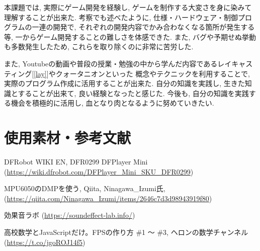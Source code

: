 \documentclass[10pt]{jsarticle}
\begin{document}
本課題では, 実際にゲーム開発を経験し, ゲームを制作する大変さを身に染みて理解することが出来た.
考察でも述べたように, 仕様・ハードウェア・制御プログラムの一連の開発で, 
それぞれの開発内容でかみ合わなくなる箇所が発生する等, 一からゲーム開発することの難しさを体感できた.
また, バグや予期せぬ挙動も多数発生したため, これらを取り除くのに非常に苦労した.

また, Youtubeの動画や普段の授業・勉強の中から学んだ内容であるレイキャスティング[\ref{lay}]やクォータニオンといった
概念やテクニックを利用することで, 実際のプログラム作成に活用することが出来た.
自分の知識を実践し, 生きた知識とすることが出来て, 良い経験となったと感じた.
今後も, 自分の知識を実践する機会を積極的に活用し, 血となり肉となるように努めていきたい.

\section{使用素材・参考文献}

\begin{enumerate}[\textrm{[}1\textrm{]}]
\item	DFRobot WIKI EN, DFR0299 DFPlayer Mini (\url{https://wiki.dfrobot.com/DFPlayer_Mini_SKU_DFR0299})	\label{MP3}
\item	MPU6050のDMPを使う, Qiita, Ninagawa\_Izumi氏, (\url{https://qiita.com/Ninagawa_Izumi/items/2646c7d3d98943919f80})	\label{DMP}
\item	効果音ラボ (\url{https://soundeffect-lab.info/})		\label{a}
\item	高校数学とJavaScriptだけ。FPSの作り方 \#1 ～ \#3, ヘロンの数学チャンネル (\url{https://t.co/jgoROJ14f5}) \label{lay}
\end{enumerate}
\end{document}
